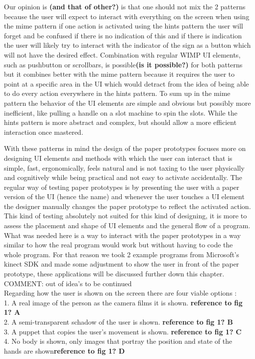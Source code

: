 Our opinion is \textbf{(and that of other?)} is that one should not mix the 2 patterns because the user will expect to interact with everything on the screen when using the mime pattern if one action is activated using the hints pattern the user will forget and be confused if there is no indication of this and if there is indication the user will likely try to interact with the indicator of the sign as a button which will not have the desired effect. Combination with regular WIMP UI elements, such as pushbutton or scrollbars, is possible\textbf{(is it possible?)} for both patterns but it combines better with the mime pattern because it requires the user to point at a specific area in the UI which would detract from the idea of being able to do every action everywhere in the hints pattern. To sum up in the mime pattern the behavior of the UI elements are simple and obvious but possibly more inefficient, like pulling a handle on a slot machine to spin the slots. While the hints pattern is more abstract and complex, but should allow a more efficient interaction once mastered.

With these patterns in mind the design of the paper prototypes focuses more on designing UI elements and methods with which the user can interact that is simple, fast, ergonomically, feels natural and is not taxing to the user physically and cognitively while being practical and not easy to activate accidentally. The regular way of testing paper prototypes is by presenting the user with a paper version of the UI (hence the name) and whenever the user touches a UI element the designer manually changes the paper prototype to reflect the activated action. This kind of testing absolutely not suited for this kind of designing, it is more to assess the placement and shape of UI elements and the general flow of a program. What was needed here is a way to interact with the paper prototypes in a way similar to how the real program would work but without having to code the whole program. For that reason we took 2 example programs from Microsoft's kinect SDK and made some adjustment to show the user in front of the paper prototype, these applications will be discussed further down this chapter. \\
{\large COMMENT: out of idea's to be continued }\\
 
 Regarding how the user is shown on the screen there are four viable options : \\
 1. A real image of the person as the camera films it is shown.  \textbf{reference to fig 1? A} \\
 2. A semi-transparent schadow of the user is shown. \textbf{reference to fig 1? B} \\
 3. A puppet that copies the user's movement is shown.  \textbf{reference to fig 1? C} \\
 4. No body is shown, only images that portray the position and state of the hands are shown\textbf{reference to fig 1? D}\\ \\
 
